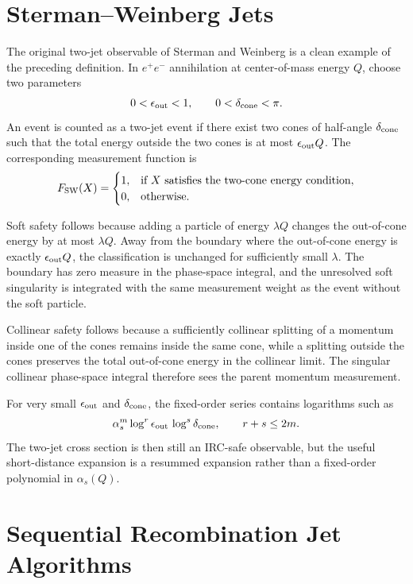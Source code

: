 \section{Sterman--Weinberg Jets}

The original two-jet observable of Sterman and Weinberg is a clean example of
the preceding definition.  In \(e^+e^-\) annihilation at center-of-mass energy
\(Q\), choose two parameters
\[
  0<\epsilon_{\rm out}<1,\qquad 0<\delta_{\rm cone}<\pi.
\]
An event is counted as a two-jet event if there exist two cones of half-angle
\(\delta_{\rm cone}\) such that the total energy outside the two cones is at
most \(\epsilon_{\rm out}Q\).  The corresponding measurement function is
\[
  F_{\rm SW}(X)
  =
  \begin{cases}
  1,& \text{if }X\text{ satisfies the two-cone energy condition},\\
  0,& \text{otherwise}.
  \end{cases}
\]

Soft safety follows because adding a particle of energy \(\lambda Q\) changes
the out-of-cone energy by at most \(\lambda Q\).  Away from the boundary
where the out-of-cone energy is exactly \(\epsilon_{\rm out}Q\), the
classification is unchanged for sufficiently small \(\lambda\).  The boundary
has zero measure in the phase-space integral, and the unresolved soft
singularity is integrated with the same measurement weight as the event
without the soft particle.

Collinear safety follows because a sufficiently collinear splitting of a
momentum inside one of the cones remains inside the same cone, while a
splitting outside the cones preserves the total out-of-cone energy in the
collinear limit.  The singular collinear phase-space integral therefore sees
the parent momentum measurement.

For very small \(\epsilon_{\rm out}\) and \(\delta_{\rm cone}\), the fixed-order
series contains logarithms such as
\[
  \alpha_s^m
  \log^r\epsilon_{\rm out}\,
  \log^s\delta_{\rm cone},
  \qquad r+s\leq 2m.
\]
The two-jet cross section is then still an IRC-safe observable, but the useful
short-distance expansion is a resummed expansion rather than a fixed-order
polynomial in \(\alpha_s(Q)\).

\section{Sequential Recombination Jet Algorithms}

